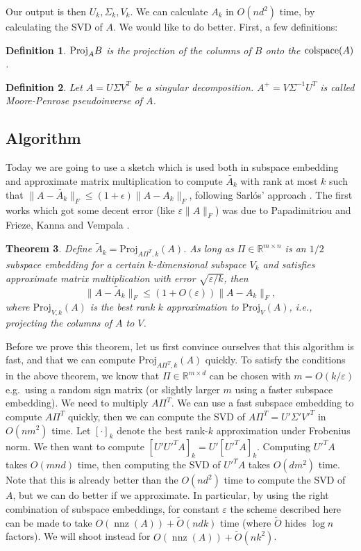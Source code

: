 \documentclass[11pt]{article}
\newcommand{\eps}{\varepsilon}
\newcommand{\R}{\mathbb{R}}
\newtheorem{theorem}{Theorem}
\newtheorem{definition}[theorem]{Definition}
\begin{document}
Our output is then $U_k, \Sigma_k, V_k$. We can calculate $A_k$ in $O(nd^2)$ time, by calculating the SVD of $A$. We would like to do better. First, a few definitions:

\begin{definition}
$\textup{Proj}_A B$ is the projection of the columns of $B$ onto the $\textup{colspace}(A)$.
\end{definition}

\begin{definition}
Let $A = U\Sigma V^T$ be a singular decomposition. $A^{+} = V\Sigma^{-1} U^T$ is called \emph{Moore-Penrose pseudoinverse} of $A$. 
\end{definition}

\subsection{Algorithm}

Today we are going to use a sketch which is used both in subspace embedding and approximate matrix multiplication to compute $\tilde{A_k}$ with rank at most $k$ such that $\|A - \tilde{A_k}\|_F \leq (1+\epsilon) \|A - A_k\|_F$, following Sarl\'{o}s' approach \cite{Sar06}. The first works which got some decent error (like $\eps \|A\|_F$) was due to Papadimitriou \cite{Papa00} and Frieze, Kanna and Vempala \cite{FKV04}.

\begin{theorem}\label{thm:main}
Define $\tilde{A}_k = \mathrm{Proj}_{A\Pi^T, k}(A)$. As long as $\Pi \in \R^{m\times n}$ is an $1/2$ subspace embedding for a certain $k$-dimensional subspace $V_k$ and satisfies approximate matrix multiplication with error $\sqrt{\eps/k}$, then 
$$
\| A - \tilde{A}_k\|_F \leq (1+ O(\eps)) \|A - A_k\|_F,
$$
where $\mathrm{Proj}_{V, k}(A)$ is the best rank $k$ approximation to $\mathrm{Proj}_V(A)$, i.e., projecting the columns of $A$ to $V$. 
\end{theorem}

Before we prove this theorem, let us first convince ourselves that this algorithm is fast, and that we can compute $\mathrm{Proj}_{A\Pi^T, k}(A)$ quickly. To satisfy the conditions in the above theorem, we know that $\Pi \in \R^{m \times d}$ can be chosen with $m = O(k / \eps)$ e.g.\ using a random sign matrix (or slightly larger $m$ using a faster subspace embedding). We need to multiply $A \Pi^T$. We can use a fast subspace embedding to compute $A\Pi^T$ quickly, then we can compute the SVD of $A \Pi^T = U'\Sigma ' V'^T$ in $O(nm^2)$ time. Let $[\cdot]_k$ denote the best rank-$k$ approximation under Frobenius norm. We then want to compute $[U'U'^TA]_k = U'[U'^TA]_k$. Computing $U'^T A$ takes $O(mnd)$ time, then computing the SVD of $U'^T A$ takes $O(dm^2)$ time. Note that this is already better than the $O(nd^2)$ time to compute the SVD of $A$, but we can do better if we approximate. In particular, by using the right combination of subspace embeddings, for constant $\eps$ the scheme described here can be made to take $O(\mathop{nnz}(A)) + \tilde{O}(ndk)$ time (where $\tilde{O}$ hides $\log n$ factors). We will shoot instead for $O(\mathop{nnz}(A)) + \tilde{O}(nk^2)$.
\end{document}
